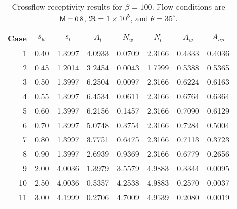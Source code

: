 \begin{table}[p]
\centering
\begin{tabular}{|r||r|r|r|r|r|r|r|}
\hline
\multicolumn{1}{|c||}{Case} & 
\multicolumn{1}{c|}{$s_w$} & 
\multicolumn{1}{c|}{$s_l$} & 
\multicolumn{1}{c|}{$A_l$} & 
\multicolumn{1}{c|}{$N_w$} & 
\multicolumn{1}{c|}{$N_l$} & 
\multicolumn{1}{c|}{$A_w$} & 
\multicolumn{1}{c|}{$A_{np}$} \\ \hline \hline
1 & 0.40 & 1.3997 & 4.0933 & 0.0709 & 2.3166 & 0.4333 & 0.4036 \\ \hline 
2 & 0.45 & 1.2014 & 3.2454 & 0.0043 & 1.7999 & 0.5388 & 0.5365 \\ \hline 
3 & 0.50 & 1.3997 & 6.2504 & 0.0097 & 2.3166 & 0.6224 & 0.6163 \\ \hline 
4 & 0.55 & 1.3997 & 6.4534 & 0.0611 & 2.3166 & 0.6764 & 0.6364 \\ \hline 
5 & 0.60 & 1.3997 & 6.2156 & 0.1457 & 2.3166 & 0.7090 & 0.6129 \\ \hline 
6 & 0.70 & 1.3997 & 5.0748 & 0.3754 & 2.3166 & 0.7284 & 0.5004 \\ \hline 
7 & 0.80 & 1.3997 & 3.7751 & 0.6475 & 2.3166 & 0.7113 & 0.3723 \\ \hline 
8 & 0.90 & 1.3997 & 2.6939 & 0.9369 & 2.3166 & 0.6779 & 0.2656 \\ \hline 
9 & 2.00 & 4.0036 & 1.3979 & 3.5579 & 4.9883 & 0.3344 & 0.0095 \\ \hline 
10 & 2.50 & 4.0036 & 0.5357 & 4.2538 & 4.9883 & 0.2570 & 0.0037 \\ \hline 
11 & 3.00 & 4.1999 & 0.2706 & 4.7009 & 4.9639 & 0.2080 & 0.0019 \\ \hline 
\end{tabular}
\caption[Crossflow receptivity results for $\beta=100$.] {Crossflow
receptivity results for $\beta=100$. Flow conditions are ${\sf M}=0.8$,
$\Re=1\times 10^5$, and $\theta=35^\circ$. \label{t:beta100} }
\end{table}

